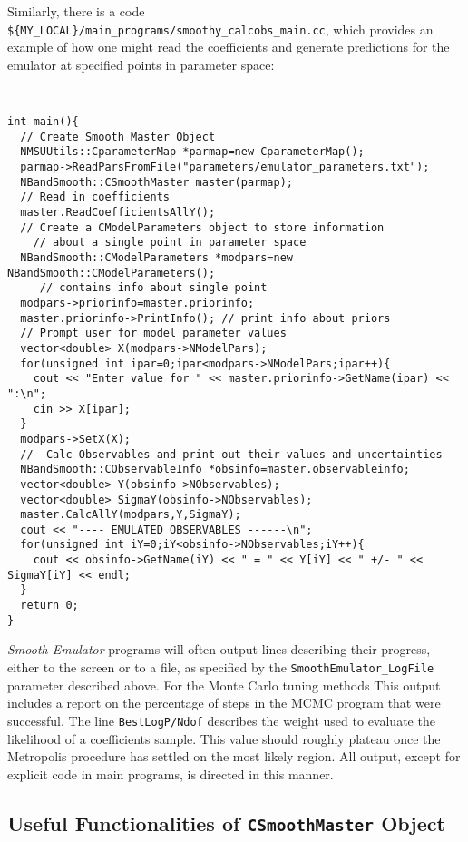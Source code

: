 \documentclass[UserManual.tex]{subfiles}
\begin{document}
Similarly, there is a code {\tt \$\{MY\_LOCAL\}/main\_programs/smoothy\_calcobs\_main.cc}, which provides an example of how one might read the coefficients and generate predictions for the emulator at specified points in parameter space:
{\tt
\begin{verbatim}
int main(){
  // Create Smooth Master Object
  NMSUUtils::CparameterMap *parmap=new CparameterMap();
  parmap->ReadParsFromFile("parameters/emulator_parameters.txt");
  NBandSmooth::CSmoothMaster master(parmap);
  // Read in coefficients
  master.ReadCoefficientsAllY();
  // Create a CModelParameters object to store information
    // about a single point in parameter space
  NBandSmooth::CModelParameters *modpars=new NBandSmooth::CModelParameters();
     // contains info about single point
  modpars->priorinfo=master.priorinfo;
  master.priorinfo->PrintInfo(); // print info about priors
  // Prompt user for model parameter values
  vector<double> X(modpars->NModelPars);
  for(unsigned int ipar=0;ipar<modpars->NModelPars;ipar++){
    cout << "Enter value for " << master.priorinfo->GetName(ipar) << ":\n";
    cin >> X[ipar];
  }
  modpars->SetX(X);
  //  Calc Observables and print out their values and uncertainties
  NBandSmooth::CObservableInfo *obsinfo=master.observableinfo;
  vector<double> Y(obsinfo->NObservables);
  vector<double> SigmaY(obsinfo->NObservables);
  master.CalcAllY(modpars,Y,SigmaY);
  cout << "---- EMULATED OBSERVABLES ------\n";
  for(unsigned int iY=0;iY<obsinfo->NObservables;iY++){
    cout << obsinfo->GetName(iY) << " = " << Y[iY] << " +/- " << SigmaY[iY] << endl;
  }
  return 0;
}
\end{verbatim}
}

{\it Smooth Emulator} programs will often output lines describing their progress, either to the screen or to a file, as specified by the {\tt SmoothEmulator\_LogFile} parameter described above. For the Monte Carlo tuning methods This output includes a report on the percentage of steps in the MCMC program that were successful. The line {\tt BestLogP/Ndof} describes the weight used to evaluate the likelihood of a coefficients sample. This value should roughly plateau once the Metropolis procedure has settled on the most likely region. All output, except for explicit code in main programs, is directed in this manner. 

\subsection{Useful Functionalities of {\tt CSmoothMaster} Object}
\end{document}
